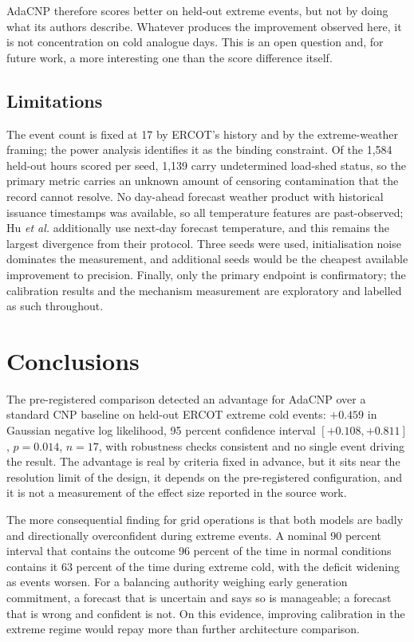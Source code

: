 \documentclass[12pt]{article} %
\begin{document}
AdaCNP therefore scores better on held-out extreme events, but not by doing what
its authors describe. Whatever produces the improvement observed here, it is not
concentration on cold analogue days. This is an open question and, for future
work, a more interesting one than the score difference itself.

\subsection{Limitations}

The event count is fixed at 17 by ERCOT's history and by the extreme-weather
framing; the power analysis identifies it as the binding constraint. Of the
1{,}584 held-out hours scored per seed, 1{,}139 carry undetermined load-shed
status, so the primary metric carries an unknown amount of censoring
contamination that the record cannot resolve. No day-ahead forecast weather
product with historical issuance timestamps was available, so all temperature
features are past-observed; Hu \emph{et al.} additionally use next-day forecast
temperature, and this remains the largest divergence from their protocol. Three
seeds were used, initialisation noise dominates the measurement, and additional
seeds would be the cheapest available improvement to precision. Finally, only the
primary endpoint is confirmatory; the calibration results and the mechanism
measurement are exploratory and labelled as such throughout.

\section{Conclusions}

The pre-registered comparison detected an advantage for AdaCNP over a standard
CNP baseline on held-out ERCOT extreme cold events: $+0.459$ in Gaussian negative
log likelihood, 95 percent confidence interval $[+0.108,+0.811]$, $p=0.014$,
$n=17$, with robustness checks consistent and no single event driving the result.
The advantage is real by criteria fixed in advance, but it sits near the
resolution limit of the design, it depends on the pre-registered configuration,
and it is not a measurement of the effect size reported in the source work.

The more consequential finding for grid operations is that both models are badly
and directionally overconfident during extreme events. A nominal 90 percent
interval that contains the outcome 96 percent of the time in normal conditions
contains it 63 percent of the time during extreme cold, with the deficit widening
as events worsen. For a balancing authority weighing early generation commitment,
a forecast that is uncertain and says so is manageable; a forecast that is wrong
and confident is not. On this evidence, improving calibration in the extreme
regime would repay more than further architecture comparison.
\end{document}
